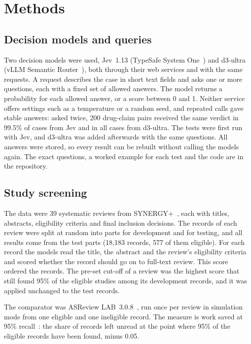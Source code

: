 \section{Methods}

\subsection{Decision models and queries}
Two decision models were used, Jev~1.13 (TypeSafe System One~\cite{jev}) and d3-ultra (vLLM Semantic Router~\cite{d3ultra}), both through their web services and with the same requests. A request describes the case in short text fields and asks one or more questions, each with a fixed set of allowed answers. The model returns a probability for each allowed answer, or a score between 0 and 1. Neither service offers settings such as a temperature or a random seed, and repeated calls gave stable answers: asked twice, 200 drug-claim pairs received the same verdict in 99.5\% of cases from Jev and in all cases from d3-ultra. The tests were first run with Jev, and d3-ultra was added afterwards with the same questions. All answers were stored, so every result can be rebuilt without calling the models again. The exact questions, a worked example for each test and the code are in the repository.

\subsection{Study screening}
The data were 39 systematic reviews from SYNERGY+~\cite{synergy}, each with titles, abstracts, eligibility criteria and final inclusion decisions. The records of each review were split at random into parts for development and for testing, and all results come from the test parts (18,183 records, 577 of them eligible). For each record the models read the title, the abstract and the review's eligibility criteria and scored whether the record should go on to full-text review. This score ordered the records. The pre-set cut-off of a review was the highest score that still found 95\% of the eligible studies among its development records, and it was applied unchanged to the test records.

The comparator was ASReview LAB~3.0.8~\cite{asreview}, run once per review in simulation mode from one eligible and one ineligible record. The measure is work saved at 95\% recall~\cite{cohen2006}: the share of records left unread at the point where 95\% of the eligible records have been found, minus 0.05.

